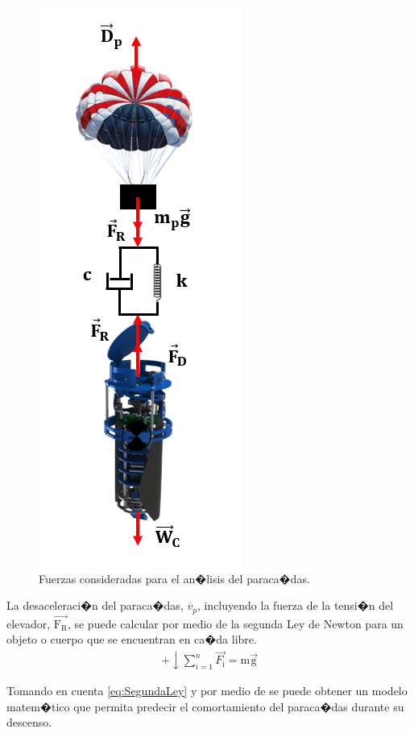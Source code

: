 \documentclass[10pt,a4paper]{book}
\begin{document}
\begin{figure}[H]
	\centering
		\includegraphics[scale=0.50]{Imagenes/Fuerzasparacaidas.png}
	\caption{Fuerzas consideradas para el an�lisis del paraca�das.\label{fig:ForcesCanSat}}
	\label{img:DisenosCansat}
\end{figure}


 La desaceleraci�n del paraca�das, $\dot{v_{p}}$, incluyendo la fuerza de la tensi�n del elevador, $\overrightarrow{\text{F}_{\text{R}}}$, se puede calcular por medio de la segunda Ley de Newton para un objeto o cuerpo que se encuentran en ca�da libre.
 \begin{align}
 \label{eq:SegundaLey}
+ \downarrow \sum_{i = 1}^{n} \overrightarrow{F_{\text{i}}} = \text{m}\overrightarrow{\text{g}} 
\end{align}  

Tomando en cuenta \eqref{eq:SegundaLey} y por medio de \cite{ModelParachute} se puede obtener un modelo matem�tico que permita predecir el comortamiento del paraca�das durante su descenso.    
 
\end{document}
